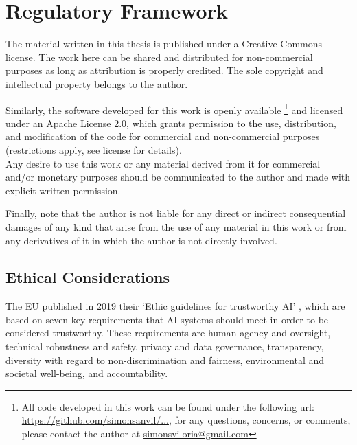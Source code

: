 \documentclass[../main.tex]{subfiles}
\begin{document}
\chapter*{Regulatory Framework} \label{chap:regulatory_framework}

The material written in this thesis is published under a Creative Commons license. The work here can be shared and distributed for non-commercial purposes as long as attribution is properly credited. The sole copyright and intellectual property belongs to the author. 

Similarly, the software developed for this work is openly available
\footnote{All code developed in this work can be found under the following url: \href{}{https://github.com/simonsanvil/...}, for any questions, concerns, or comments, please contact the author at \href{mailto:simonsviloria@gmail.com}{simonsviloria@gmail.com}
} 
and licensed under an \href{https://en.wikipedia.org/wiki/Apache_License}{Apache License 2.0}, which grants permission to the use, distribution, and modification of the code for commercial and non-commercial purposes (restrictions apply, see license for details). \\

Any desire to use this work or any material derived from it for commercial and/or monetary purposes should be communicated to the author and made with explicit written permission.


Finally, note that the author is not liable for any direct or indirect consequential damages of any kind that arise from the use of any material in this work or from any derivatives of it in which the author is not directly involved.

\section*{Ethical Considerations}  \label{ethics}

The EU published in 2019 their `Ethic guidelines for trustworthy AI' \cite{noauthor_ethics_2019}, which are based on seven key requirements that AI systems should meet in order to be considered trustworthy. These requirements are human agency and oversight, technical robustness and safety, privacy and data governance, transparency, diversity with regard to non-discrimination and fairness, environmental and societal well-being, and accountability. 
\end{document}
